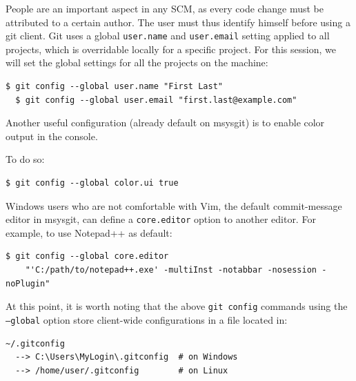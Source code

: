 \documentclass{../../common/tufte-latex/tufte-handout}
\begin{document}
People are an important aspect in any SCM, as every code change must be attributed to a certain author.
The user must thus identify himself before using a git client.
Git uses a global \texttt{user.name} and \texttt{user.email} setting applied to all projects, which is overridable locally for a specific project.
For this session, we will set the global settings for all the projects on the machine:

\begin{lstlisting}[style=BashInputStyle]
  $ git config --global user.name "First Last"
  $ git config --global user.email "first.last@example.com"
\end{lstlisting}

Another useful configuration (already default on msysgit) is to enable color output in the console.

\noindent To do so:

\begin{lstlisting}[style=BashInputStyle]
  $ git config --global color.ui true
\end{lstlisting}

Windows users who are not comfortable with Vim, the default commit-message editor in msysgit, can define a \texttt{core.editor} option to another editor.
For example, to use Notepad++ as default:

\begin{lstlisting}[style=BashInputStyle]
  $ git config --global core.editor
    "'C:/path/to/notepad++.exe' -multiInst -notabbar -nosession -noPlugin"
\end{lstlisting}

At this point, it is worth noting that the above \texttt{git config} commands using the \texttt{--global} option store client-wide configurations in a file located in:

\begin{lstlisting}[style=BashInputStyle]
  ~/.gitconfig
  --> C:\Users\MyLogin\.gitconfig  # on Windows
  --> /home/user/.gitconfig        # on Linux
\end{lstlisting}
\end{document}

